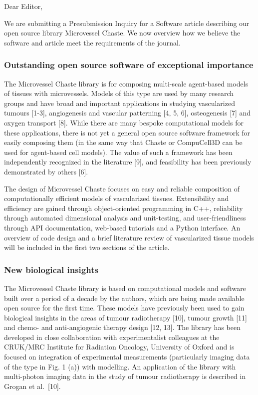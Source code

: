 \documentclass[fullpage,11pt]{article}
\begin{document}
  

\noindent Dear Editor,

\noindent We are submitting a Presubmission Inquiry for a Software article describing our open source library Microvessel Chaste.  We now overview how we believe the software and article meet the requirements of the journal.

\subsubsection*{Outstanding open source software of exceptional importance}
The Microvessel Chaste library is for composing multi-scale agent-based models of tissues with microvessels. Models of this type are used by many research groups and have broad and important applications in studying vascularized tumours [1-3], angiogenesis and vascular patterning [4, 5, 6],  osteogenesis [7] and oxygen transport [8]. While there are many bespoke computational models for these applications, there is not yet a general open source software framework for easily composing them (in the same way that Chaste or CompuCell3D can be used for agent-based cell models). The value of such a framework has been independently recognized in the literature [9], and feasibility has been previously demonstrated by others [6].

The design of Microvessel Chaste focuses on easy and reliable composition of computationally efficient models of vascularized tissues. Extensibility and efficiency are gained through object-oriented programming in C++, reliability through automated dimensional analysis and unit-testing, and user-friendliness through API documentation, web-based tutorials and a Python interface. An overview of code design and a brief literature review of vascularized tissue models will be included in the first two sections of the article.

\subsubsection*{New biological insights}
The Microvessel Chaste library is based on computational models and software built over a period of a decade by the authors, which are being made available open source for the first time. These models have previously been used to gain biological insights in the areas of tumour radiotherapy [10], tumour growth [11] and chemo- and anti-angiogenic therapy design [12, 13]. The library has been developed in close collaboration with experimentalist colleagues at the CRUK/MRC Institute for Radiation Oncology, University of Oxford and is focused on integration of experimental measurements (particularly imaging data of the type in Fig. 1 (a)) with modelling. An application of the library with multi-photon imaging data in the study of tumour radiotherapy is described in Grogan et al.~[10].
\end{document}
